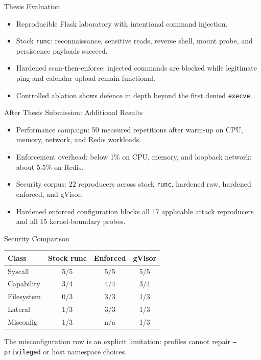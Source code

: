 \documentclass[aspectratio=169]{beamer}
\begin{document}
\begin{frame}{Thesis Evaluation}
  \begin{itemize}
    \item Reproducible Flask laboratory with intentional command injection.
    \item Stock \texttt{runc}: reconnaissance, sensitive reads, reverse shell, mount probe, and persistence payloads succeed.
    \item Hardened scan-then-enforce: injected commands are blocked while legitimate ping and calendar upload remain functional.
    \item Controlled ablation shows defence in depth beyond the first denied \texttt{execve}.
  \end{itemize}
\end{frame}

\begin{frame}{After Thesis Submission: Additional Results}
  \begin{itemize}
    \item Performance campaign: 50 measured repetitions after warm-up on CPU, memory, network, and Redis workloads.
    \item Enforcement overhead: below 1\% on CPU, memory, and loopback network; about 5.5\% on Redis.
    \item Security corpus: 22 reproducers across stock \texttt{runc}, hardened raw, hardened enforced, and gVisor.
    \item Hardened enforced configuration blocks all 17 applicable attack reproducers and all 15 kernel-boundary probes.
  \end{itemize}
\end{frame}

\begin{frame}{Security Comparison}
  \begin{center}
  \begin{tabular}{lccc}
    \hline
    \textbf{Class} & \textbf{Stock runc} & \textbf{Enforced} & \textbf{gVisor} \\
    \hline
    Syscall & 5/5 & 5/5 & 5/5 \\
    Capability & 3/4 & 4/4 & 3/4 \\
    Filesystem & 0/3 & 3/3 & 1/3 \\
    Lateral & 1/3 & 3/3 & 1/3 \\
    Misconfig & 1/3 & n/a & 1/3 \\
    \hline
  \end{tabular}
  \end{center}
  \vspace{0.5em}
  \small{The misconfiguration row is an explicit limitation: profiles cannot repair \texttt{--privileged} or host namespace choices.}
\end{frame}
\end{document}
